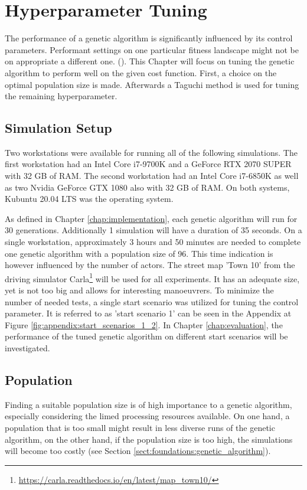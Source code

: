 \chapter{Hyperparameter Tuning}
\label{chap:hyperparameter_tuning}
The performance of a genetic algorithm is significantly influenced by its control parameters. Performant settings on one particular fitness landscape might not be on appropriate a different one. (\cite{kacprzyk_parameter_2007}). This Chapter will focus on tuning the genetic algorithm to perform well on the given cost function. First, a choice on the optimal population size is made. Afterwards a Taguchi method is used for tuning the remaining hyperparameter.

\section{Simulation Setup}
\label{sect:hyperparameter_tuning:simulation_setup}
Two workstations were available for running all of the following simulations. The first workstation had an Intel Core i7-9700K and a GeForce RTX 2070 SUPER with 32 GB of RAM. The second workstation had an Intel Core i7-6850K as well as two Nvidia GeForce GTX 1080 also with 32 GB of RAM. On both systems, Kubuntu 20.04 LTS was the operating system.

As defined in Chapter \ref{chap:implementation}, each genetic algorithm will run for 30 generations. Additionally 1 simulation will have a duration of 35 seconds. On a single workstation, approximately 3 hours and 50 minutes are needed to complete one genetic algorithm with a population size of 96. This time indication is however influenced by the number of actors. The street map 'Town 10' from the driving simulator Carla\footnote{\href{https://carla.readthedocs.io/en/latest/map_town10/}{https://carla.readthedocs.io/en/latest/map\_town10/}} will be used for all experiments. It has an adequate size, yet is not too big and allows for interesting manoeuvrers. To minimize the number of needed tests, a single start scenario was utilized for tuning the control parameter. It is referred to as 'start scenario 1' can be seen in the Appendix at Figure \ref{fig:appendix:start_scenarios_1_2}. In Chapter \ref{chap:evaluation}, the performance of the tuned genetic algorithm on different start scenarios will be investigated.

\section{Population}
\label{sect:hyperparameter_tuning:population}
Finding a suitable population size is of high importance to a genetic algorithm, especially considering the limed processing resources available. On one hand, a population that is too small might result in less diverse runs of the genetic algorithm, on the other hand, if the population size is too high, the simulations will become too costly (see Section \ref{sect:foundations:genetic_algorithm}).

